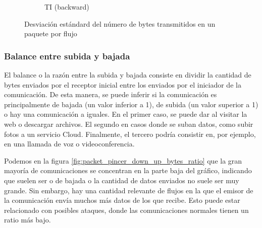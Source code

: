 \begin{figure}[H]
\begin{subfigure}[b]{0.26\textwidth}
        \caption{TI (backward)}
    \end{subfigure}
    \hfill
       \caption{Desviación estándard del número de bytes transmitidos en un paquete por flujo}
       \label{fig:packet_pincer_packet_bytes_std}
\end{figure}

\subsubsection{Balance entre subida y bajada}

El balance o la razón entre la subida y bajada consiste en dividir la cantidad de bytes enviados por el receptor inicial entre los enviados por el iniciador de la comunicación. De esta manera, se puede inferir si la comunicación es principalmente de bajada (un valor inferior a 1), de subida (un valor superior a 1) o hay una comunicación a iguales. En el primer caso, se puede dar al visitar la web o descargar archivos. El segundo en casos donde se suban datos, como subir fotos a un servicio Cloud. Finalmente, el tercero podría consistir en, por ejemplo, en una llamada de voz o videoconferencia. 

Podemos en la figura \ref{fig:packet_pincer_down_up_bytes_ratio} que la gran mayoría de comunicaciones se concentran en la parte baja del gráfico, indicando que suelen ser o de bajada o la cantidad de datos enviados no suele ser muy grande. Sin embargo, hay una cantidad relevante de flujos en la que el emisor de la comunicación envía muchos más datos de los que recibe. Esto puede estar relacionado con posibles ataques, donde las comunicaciones normales tienen un ratio más bajo.

